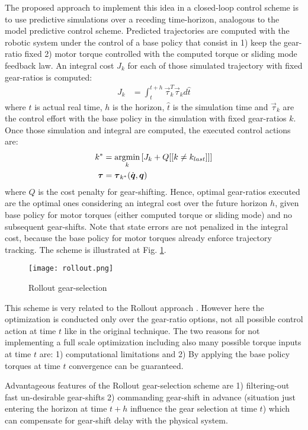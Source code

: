 The proposed approach to implement this idea in a closed-loop control scheme is to use predictive simulations over a receding time-horizon, analogous to the model predictive control scheme. Predicted trajectories are computed with the robotic system under the control of a base policy that consist in 1) keep the gear-ratio fixed 2) motor torque controlled with the computed torque or sliding mode feedback law. An integral cost $J_k$ for each of those simulated trajectory with fixed gear-ratios is computed:
%
\begin{align}
J_k &= \int_t^{t+h} \vec{\tau}_k^T \vec{\tau}_k d\hat{t}
\end{align}
%
where $t$ is actual real time, $h$ is the horizon, $\hat{t}$ is the simulation time and $\vec{\tau}_k$ are the control effort with the base policy in the simulation with fixed gear-ratios $k$. Once those simulation and integral are computed, the executed control actions are:
%
\begin{align}
k^{*}      &= \operatornamewithlimits{argmin}\limits_{k} \left[ J_k + Q [[ k \neq k_{last}]] \right] \\
\vec{\tau} &= \vec{\tau}_{k^*}( \dot{\vec{q}} , \vec{q} )
\end{align}
%
where $Q$ is the cost penalty for gear-shifting. Hence, optimal gear-ratios executed are the optimal ones considering an integral cost over the future horizon $h$, given base policy for motor torques (either computed torque or sliding mode) and no subsequent gear-shifts. Note that state errors are not penalized in the integral cost, because the base policy for motor torques already enforce trajectory tracking. The scheme is illustrated at Fig. \ref{fig:rollout}.
%
\begin{figure}[htp]
	\centering
		\texttt{[image: rollout.png]}
	\caption[Rollout gear-selection]{Rollout gear-selection}
	\label{fig:rollout}
\end{figure}
%
This scheme is very related to the Rollout approach \cite{bertsekas_dynamic_2000}. However here the optimization is conducted only over the gear-ratio options, not all possible control action at time $t$ like in the original technique. The two reasons for not implementing a full scale optimization including also many possible torque inputs at time $t$ are: 1) computational limitations and 2) By applying the base policy torques at time $t$ convergence can be guaranteed. 

Advantageous features of the Rollout gear-selection scheme are 1) filtering-out fast un-desirable gear-shifts 2) commanding gear-shift in advance (situation just entering the horizon at time $t+h$ influence the gear selection at time $t$) which can compensate for gear-shift delay with the physical system.

